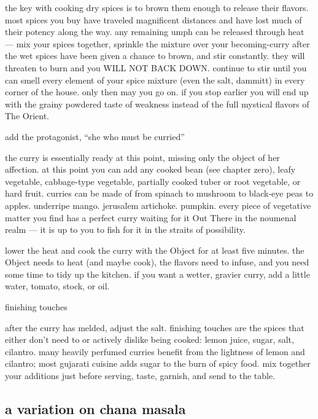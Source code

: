 \begin{algorithm}
  the key with cooking dry spices is to brown them enough to release their 
  flavors. most spices you buy have traveled magnificent distances and have 
  lost much of their potency along the way. any remaining umph can be released 
  through heat --- mix your spices together, sprinkle the mixture over your 
  becoming-curry after the wet spices have been given a chance to brown, and 
  stir constantly. they will threaten to burn and you WILL NOT BACK DOWN. 
  continue to stir until you can smell every element of your spice mixture 
  (even the salt, dammitt) in every corner of the house. only then may you go 
  on. if you stop earlier you will end up with the grainy powdered taste of 
  weakness instead of the full mystical flavors of The Orient.

  \item add the protagonist, ``she who must be curried''

  the curry is essentially ready at this point, missing only the object of her 
  affection. at this point you can add any cooked bean (see chapter zero), 
  leafy vegetable, cabbage-type vegetable, partially cooked tuber or root 
  vegetable, or hard fruit. curries can be made of  from spinach to 
  mushroom to black-eye peas to apples. underripe mango. jerusalem artichoke. 
  pumpkin. every piece of vegetative matter you find has a perfect curry 
  waiting for it Out There in the noumenal realm --- it is up to you to fish 
  for it in the straits of possibility.
  
  lower the heat and cook the curry with the Object for at least five minutes. 
  the Object needs to heat (and maybe cook), the flavors need to infuse, and 
  you need some time to tidy up the kitchen. if you want a wetter, gravier 
  curry, add a little water, tomato, stock, or oil.

  \item finishing touches

  after the curry has melded, adjust the salt. finishing touches are the spices 
  that either don't need to or actively dislike being cooked: lemon juice, 
  sugar, salt, cilantro. many heavily perfumed curries benefit from the 
  lightness of lemon and cilantro; most gujarati cuisine adds sugar to  
  the burn of spicy food. mix together your additions just before serving, 
  taste, garnish, and send to the table.
\end{algorithm}

\subsection{a variation on chana masala}

